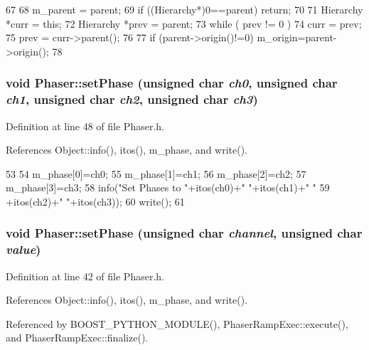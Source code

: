 \begin{DoxyCode}
67                                               {
68   m_parent = parent;
69   if ((Hierarchy*)0==parent) return;
70 
71   Hierarchy *curr = this;
72   Hierarchy *prev = parent;
73   while ( prev != 0 ){
74     curr = prev;
75     prev = curr->parent();
76   }
77   if (parent->origin()!=0) m_origin=parent->origin();
78 }
\end{DoxyCode}
\hypertarget{classPhaser_a658be408ea31d55067e283723fa144f1}{
\subsubsection[{setPhase}]{\setlength{\rightskip}{0pt plus 5cm}void Phaser::setPhase (unsigned char {\em ch0}, \/  unsigned char {\em ch1}, \/  unsigned char {\em ch2}, \/  unsigned char {\em ch3})}}
\label{classPhaser_a658be408ea31d55067e283723fa144f1}


Definition at line 48 of file Phaser.h.

References Object::info(), itos(), m\_\-phase, and write().


\begin{DoxyCode}
53        {
54     m_phase[0]=ch0;
55     m_phase[1]=ch1;
56     m_phase[2]=ch2;
57     m_phase[3]=ch3;
58     info("Set Phases to "+itos(ch0)+" "+itos(ch1)+" "
59         +itos(ch2)+" "+itos(ch3));
60     write();
61   }
\end{DoxyCode}
\hypertarget{classPhaser_a35c0add55885b3c0a7551ff48e322632}{
\subsubsection[{setPhase}]{\setlength{\rightskip}{0pt plus 5cm}void Phaser::setPhase (unsigned char {\em channel}, \/  unsigned char {\em value})}}
\label{classPhaser_a35c0add55885b3c0a7551ff48e322632}


Definition at line 42 of file Phaser.h.

References Object::info(), itos(), m\_\-phase, and write().

Referenced by BOOST\_\-PYTHON\_\-MODULE(), PhaserRampExec::execute(), and PhaserRampExec::finalize().


